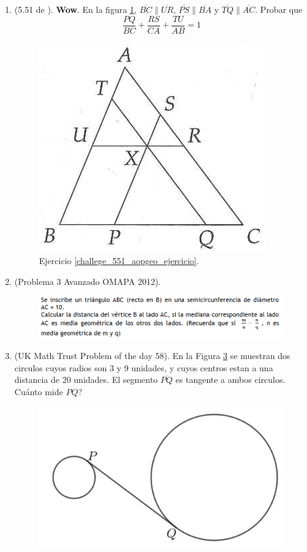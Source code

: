 \begin{enumerate}
	\item \label{challege_551_aopgeo_ejercicio}(5.51 de \cite{Aops_Geometria}). \textbf{Wow}. En la figura \ref{challege_551_aopgeo_ejer},  $\overline{BC} \parallel \overline{UR}$, $\overline{PS} \parallel \overline{BA}$ y $\overline{TQ} \parallel \overline{AC}$. Probar que
	\[
			\frac{PQ}{BC} + \frac{RS}{CA} + \frac{TU}{AB} = 1
	\]
			\begin{figure}[H]
				\centering
				\includegraphics[width=0.4\linewidth]{Geometria/imgs/challege_551_aopgeo_ejer}
				\caption{Ejercicio \ref{challege_551_aopgeo_ejercicio}.}
				\label{challege_551_aopgeo_ejer}
			\end{figure}
	
	\item (Problema 3 Avanzado OMAPA 2012). 
			\begin{figure}[H]
				\centering
				\includegraphics[width=\linewidth]{Geometria/imgs/OMAPA_AV_2012_P3}
				\label{OMAPA_AV_2012_P3}
			\end{figure}
	
	\item (UK Math Trust Problem of the day 58). En la Figura \ref{UK58} se muestran dos circulos cuyos radios son 3 y 9 unidades, y cuyos centros estan a una distancia de 20 unidades. El segmento $\overline{PQ}$ es tangente a ambos circulos. Cuánto mide $PQ$?
	
			\begin{figure}[H]
				\centering
				\includegraphics[width=0.5\linewidth]{Geometria/imgs/UKMathTrust_PrblemOfTheDay_58}
				\label{UK58}
			\end{figure}
		

\end{enumerate}
